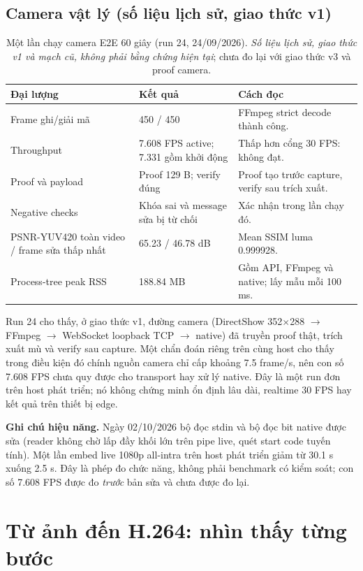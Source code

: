 \documentclass[11pt,a4paper]{article}
\renewcommand{\_}{\origunderscore\allowbreak}
\begin{document}
\subsection{Camera vật lý (số liệu lịch sử, giao thức v1)}
\begin{table}[H]\centering\small
\caption{Một lần chạy camera E2E 60 giây (run 24, 24/09/2026). \emph{Số liệu lịch sử, giao thức v1 và mạch cũ, không phải bằng chứng hiện tại}; chưa đo lại với giao thức v3 và proof camera.}
\begin{tabular}{p{6cm}p{3cm}p{4.8cm}}\toprule
Đại lượng & Kết quả & Cách đọc\\\midrule
Frame ghi/giải mã & 450 / 450 & FFmpeg strict decode thành công.\\
Throughput & 7.608 FPS active; 7.331 gồm khởi động & Thấp hơn cổng 30 FPS: không đạt.\\
Proof và payload & Proof 129 B; verify đúng & Proof tạo trước capture, verify sau trích xuất.\\
Negative checks & Khóa sai và message sửa bị từ chối & Xác nhận trong lần chạy đó.\\
PSNR-YUV420 toàn video / frame sửa thấp nhất & 65.23 / 46.78 dB & Mean SSIM luma 0.999928.\\
Process-tree peak RSS & 188.84 MB & Gồm API, FFmpeg và native; lấy mẫu mỗi 100 ms.\\
\bottomrule\end{tabular}
\end{table}
Run 24 cho thấy, ở giao thức v1, đường camera (DirectShow 352$\times$288 $\rightarrow$ FFmpeg $\rightarrow$ WebSocket loopback TCP $\rightarrow$ native) đã truyền proof thật, trích xuất mù và verify sau capture. Một chẩn đoán riêng trên cùng host cho thấy trong điều kiện đó chính nguồn camera chỉ cấp khoảng 7.5 frame/s, nên con số 7.608 FPS chưa quy được cho transport hay xử lý native. Đây là một run đơn trên host phát triển; nó không chứng minh ổn định lâu dài, realtime 30 FPS hay kết quả trên thiết bị edge.

\textbf{Ghi chú hiệu năng.} Ngày 02/10/2026 bộ đọc stdin và bộ đọc bit native được sửa (reader không chờ lấp đầy khối lớn trên pipe live, quét start code tuyến tính). Một lần embed live 1080p all-intra trên host phát triển giảm từ 30.1 s xuống 2.5 s. Đây là phép đo chức năng, không phải benchmark có kiểm soát; con số 7.608 FPS được đo \emph{trước} bản sửa và chưa được đo lại.

\section{Từ ảnh đến H.264: nhìn thấy từng bước}
\end{document}

